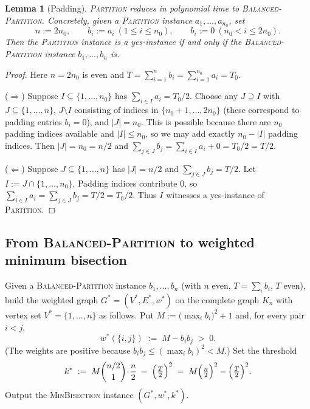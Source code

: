 \documentclass{amsart}
\theoremstyle{plain}
\newtheorem{lemma}{Lemma}
\theoremstyle{definition}
\theoremstyle{remark}
\begin{document}
\begin{lemma}[Padding]\label{lem:padding}
\textsc{Partition} reduces in polynomial time to \textsc{Balanced-Partition}.
Concretely, given a \textsc{Partition} instance $a_1,\dots,a_{n_0}$, set
\[
 n:=2n_0,\qquad b_i:=a_i \ (1\le i\le n_0),\qquad b_i:=0 \ (n_0<i\le 2n_0).
\]
Then the \textsc{Partition} instance is a yes-instance if and only if the
\textsc{Balanced-Partition} instance $b_1,\dots,b_n$ is.
\end{lemma}

\begin{proof}
Here $n=2n_0$ is even and $T=\sum_{i=1}^{n} b_i=\sum_{i=1}^{n_0} a_i=T_0$.

($\Rightarrow$) Suppose $I\subseteq\{1,\dots,n_0\}$ has $\sum_{i\in I} a_i=T_0/2$.
Choose any $J\supseteq I$ with $J\subseteq\{1,\dots,n\}$, $J\setminus I$ consisting of
indices in $\{n_0+1,\dots,2n_0\}$ (these correspond to padding entries $b_i=0$), and
$|J|=n_0$. This is possible because there are $n_0$ padding indices available and
$|I|\le n_0$, so we may add exactly $n_0-|I|$ padding indices. Then $|J|=n_0=n/2$ and
$\sum_{j\in J} b_j=\sum_{i\in I} a_i + 0 = T_0/2 = T/2$.

($\Leftarrow$) Suppose $J\subseteq\{1,\dots,n\}$ has $|J|=n/2$ and $\sum_{j\in J} b_j=T/2$.
Let $I:=J\cap\{1,\dots,n_0\}$. Padding indices contribute $0$, so
$\sum_{i\in I} a_i=\sum_{j\in J} b_j=T/2=T_0/2$. Thus $I$ witnesses a yes-instance of
\textsc{Partition}.
\end{proof}

\subsection{From \textsc{Balanced-Partition} to weighted minimum bisection}

\begin{construction}\label{constr:Kn}
Given a \textsc{Balanced-Partition} instance $b_1,\dots,b_n$ (with $n$ even,
$T=\sum_i b_i$, $T$ even), build the weighted graph $G^{\ast}=(V^{\ast},E^{\ast},w^{\ast})$
on the complete graph $K_n$ with vertex set $V^{\ast}=\{1,\dots,n\}$ as follows. Put
$M:=\bigl(\max_i b_i\bigr)^2+1$ and, for every pair $i<j$,
\[
  w^{\ast}(\{i,j\}) \;:=\; M - b_i b_j \;>\;0 .
\]
(The weights are positive because $b_i b_j\le (\max_i b_i)^2 < M$.) Set the threshold
\[
  k^{\ast}\;:=\;M\binom{n/2}{1}\!\cdot\!\frac{n}{2} \;-\;\Bigl(\tfrac{T}{2}\Bigr)^{2}
   \;=\; M\Bigl(\tfrac{n}{2}\Bigr)^{2}-\Bigl(\tfrac{T}{2}\Bigr)^{2}.
\]
Output the \textsc{MinBisection} instance $(G^{\ast},w^{\ast},k^{\ast})$.
\end{construction}
\end{document}
